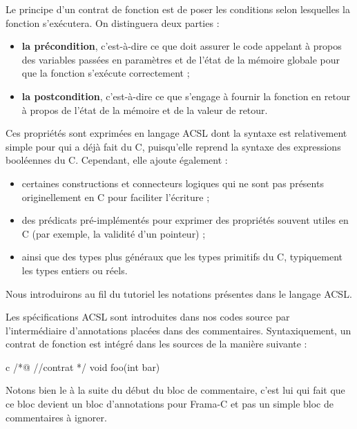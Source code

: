 Le principe d'un contrat de fonction est de poser les conditions selon
lesquelles la fonction s'exécutera. On distinguera deux parties :


\begin{itemize}
\item \textbf{la précondition}, c'est-à-dire ce que doit assurer le code
      appelant à propos des variables passées en paramètres et de l'état de
      la mémoire globale pour que la fonction s'exécute correctement ;
\item \textbf{la postcondition}, c'est-à-dire ce que s'engage à fournir la
      fonction en retour à propos de l'état de la mémoire et de la valeur de
      retour.
\end{itemize}


Ces propriétés sont exprimées en langage ACSL dont la syntaxe est relativement
simple pour qui a déjà fait du C, puisqu'elle reprend la syntaxe des expressions
booléennes du C. Cependant, elle ajoute également :



\begin{itemize}
\item certaines constructions et connecteurs logiques qui ne sont pas présents
originellement en C pour faciliter l'écriture ;
\item des prédicats pré-implémentés pour exprimer des propriétés souvent utiles
en C (par exemple, la validité d'un pointeur) ;
\item ainsi que des types plus généraux que les types primitifs du C,
typiquement les types entiers ou réels.
\end{itemize}


Nous introduirons au fil du tutoriel les notations présentes dans le
langage ACSL.



Les spécifications ACSL sont introduites dans nos codes source par
l'intermédiaire d'annotations placées dans des commentaires. Syntaxiquement,
un contrat de fonction est intégré dans les sources de la manière suivante :



\begin{CodeBlock}{c}
/*@
  //contrat
*/
void foo(int bar){

}
\end{CodeBlock}



Notons bien le  à la suite du début du bloc de commentaire, c'est lui qui
fait que ce bloc devient un bloc d'annotations pour Frama-C et pas un simple
bloc de commentaires à ignorer.



